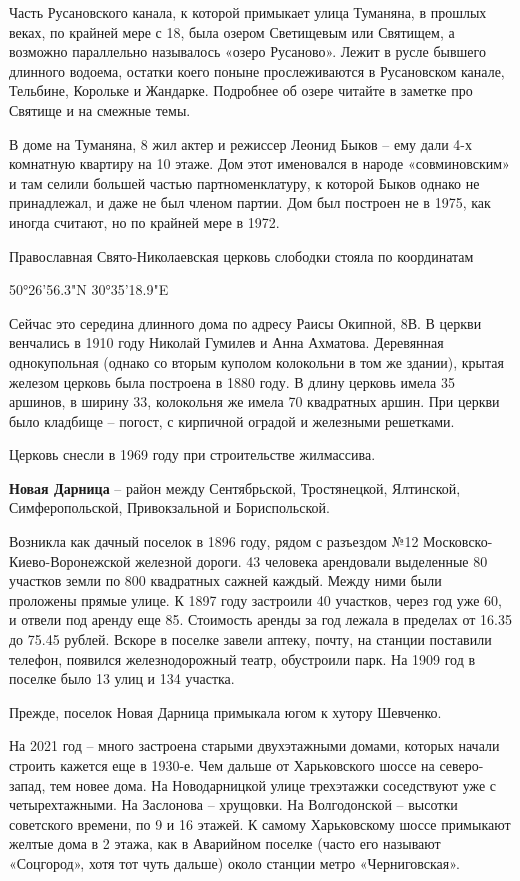 Часть Русановского канала, к которой примыкает улица Туманяна, в прошлых веках, по крайней мере с 18, была озером Светищевым или Святищем, а возможно параллельно называлось «озеро Русаново». Лежит в русле бывшего длинного водоема, остатки коего поныне прослеживаются в Русановском канале, Тельбине, Корольке и Жандарке. Подробнее об озере читайте в заметке про Святище и на смежные темы.

В доме на Туманяна, 8 жил актер и режиссер Леонид Быков – ему дали 4-х комнатную квартиру на 10 этаже. Дом этот именовался в народе «совминовским» и там селили большей частью партноменклатуру, к которой Быков однако не принадлежал, и даже не был членом партии. Дом был построен не в 1975, как иногда считают, но по крайней мере в 1972.

Православная Свято-Николаевская церковь слободки стояла по координатам

50°26'56.3"N 30°35'18.9"E

Сейчас это середина длинного дома по адресу Раисы Окипной, 8В. В церкви венчались в 1910 году Николай Гумилев и Анна Ахматова. Деревянная однокупольная (однако со вторым куполом колокольни в том же здании), крытая железом церковь была построена в 1880 году. В длину церковь имела 35 аршинов, в ширину 33, колокольня же имела 70 квадратных аршин. При церкви было кладбище – погост, с кирпичной оградой и железными решетками. 

Церковь снесли в 1969 году при строительстве жилмассива.\\ 

\medskip


\textbf{Новая Дарница} – район между Сентябрьской, Тростянецкой, Ялтинской, Симферопольской, Привокзальной и Бориспольской. 

Возникла как дачный поселок в 1896 году, рядом с разъездом №12 Московско-Киево-Воронежской железной дороги. 43 человека арендовали выделенные 80 участков земли по 800 квадратных сажней каждый. Между ними были проложены прямые улице. К 1897 году застроили 40 участков, через год уже 60, и отвели под аренду еще 85. Стоимость аренды за год лежала в пределах от 16.35 до 75.45 рублей. Вскоре в поселке завели аптеку, почту, на станции поставили телефон, появился железнодорожный театр, обустроили парк. На 1909 год в поселке было 13 улиц и 134 участка.

Прежде, поселок Новая Дарница примыкала югом к хутору Шевченко. 

На 2021 год – много застроена старыми двухэтажными домами, которых начали строить кажется еще в 1930-е. Чем дальше от Харьковского шоссе на северо-запад, тем новее дома. На Новодарницкой улице трехэтажки соседствуют уже с четырехтажными. На Заслонова – хрущовки. На Волгодонской – высотки советского времени, по 9 и 16 этажей. К самому Харьковскому шоссе примыкают желтые дома в 2 этажа, как в Аварийном поселке (часто его называют «Соцгород», хотя тот чуть дальше) около станции метро «Черниговская».
